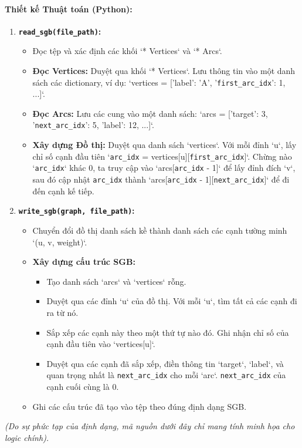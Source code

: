 \documentclass[a4paper,12pt]{article}
\begin{document}
\paragraph{Thiết kế Thuật toán (Python):}
\begin{enumerate}
    \item \textbf{\texttt{read\_sgb(file\_path)}:}
        \begin{itemize}
            \item Đọc tệp và xác định các khối `* Vertices` và `* Arcs`.
            \item \textbf{Đọc Vertices:} Duyệt qua khối `* Vertices`. Lưu thông tin vào một danh sách các dictionary, ví dụ: `vertices = [{'label': 'A', '\texttt{first\_arc\_idx}': 1}, ...]`.
            \item \textbf{Đọc Arcs:} Lưu các cung vào một danh sách: `arcs = [{'target': 3, '\texttt{next\_arc\_idx}': 5, 'label': 12}, ...]`.
            \item \textbf{Xây dựng Đồ thị:} Duyệt qua danh sách `vertices`. Với mỗi đỉnh `u`, lấy chỉ số cạnh đầu tiên `\texttt{arc\_idx} = vertices[u][\texttt{first\_arc\_idx}]`. Chừng nào `\texttt{arc\_idx}` khác 0, ta truy cập vào `arcs[\texttt{arc\_idx} - 1]` để lấy đỉnh đích `v`, sau đó cập nhật \texttt{arc\_idx} thành `arcs[\texttt{arc\_idx} - 1][\texttt{next\_arc\_idx}]` để đi đến cạnh kế tiếp.
        \end{itemize}
    \item \textbf{\texttt{write\_sgb(graph, file\_path)}:}
        \begin{itemize}
            \item Chuyển đổi đồ thị danh sách kề thành danh sách các cạnh tường minh `(u, v, weight)`.
            \item \textbf{Xây dựng cấu trúc SGB:}
                \begin{itemize}
                    \item Tạo danh sách `arcs` và `vertices` rỗng.
                    \item Duyệt qua các đỉnh `u` của đồ thị. Với mỗi `u`, tìm tất cả các cạnh đi ra từ nó.
                    \item Sắp xếp các cạnh này theo một thứ tự nào đó. Ghi nhận chỉ số của cạnh đầu tiên vào `vertices[u]`.
                    \item Duyệt qua các cạnh đã sắp xếp, điền thông tin `target`, `label`, và quan trọng nhất là \texttt{next\_arc\_idx} cho mỗi `arc`. \texttt{next\_arc\_idx} của cạnh cuối cùng là 0.
                \end{itemize}
            \item Ghi các cấu trúc đã tạo vào tệp theo đúng định dạng SGB.
        \end{itemize}
\end{enumerate}
\textit{(Do sự phức tạp của định dạng, mã nguồn dưới đây chỉ mang tính minh họa cho logic chính).}
\end{document}
